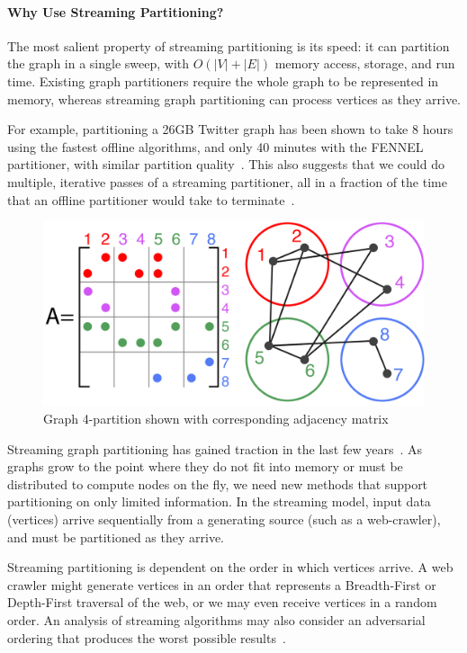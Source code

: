 \paragraph{Why Use Streaming Partitioning?}
The most salient property of streaming partitioning is its speed: it can partition the graph in a single sweep, with $O(|V| + |E|)$ memory access, storage, and run time. Existing graph partitioners require the whole graph to be represented in memory, whereas streaming graph partitioning can process vertices as they arrive.

For example, partitioning a 26GB Twitter graph has been shown to take 8 hours using the fastest offline algorithms, and only 40 minutes with the FENNEL partitioner, with similar partition quality~\cite{tsourakakis2012fennel}. This also suggests that we could do multiple, iterative passes of a streaming partitioner, all in a fraction of the time that an offline partitioner would take to terminate~\cite{nishimura2013restream}.


\begin{figure}[h]
\centering
\includegraphics[width=0.85\columnwidth] {figures/graphpart1.png}
\caption[Caption for]{Graph 4-partition shown with corresponding adjacency matrix}
\label{fig:0}
\end{figure}


Streaming graph partitioning has gained traction in the last few years~\cite{DBLP:journals/corr/abs-1212-1121,Stanton:2012:SGP:2339530.2339722,tsourakakis2012fennel}.
As graphs grow to the point where they do not fit into memory or must be distributed to compute nodes on the fly, we need new methods that support partitioning on only limited information.
In the streaming model, input data (vertices) arrive sequentially from a generating source (such as a web-crawler), and must be partitioned as they arrive.

Streaming partitioning is dependent on the order in which vertices arrive.
A web crawler might generate vertices in an order that represents a Breadth-First or Depth-First traversal of the web, or we may even receive vertices in a random order.
An analysis of streaming algorithms may also consider an adversarial ordering that produces the worst possible results~\cite{Stanton:2012:SGP:2339530.2339722}.


